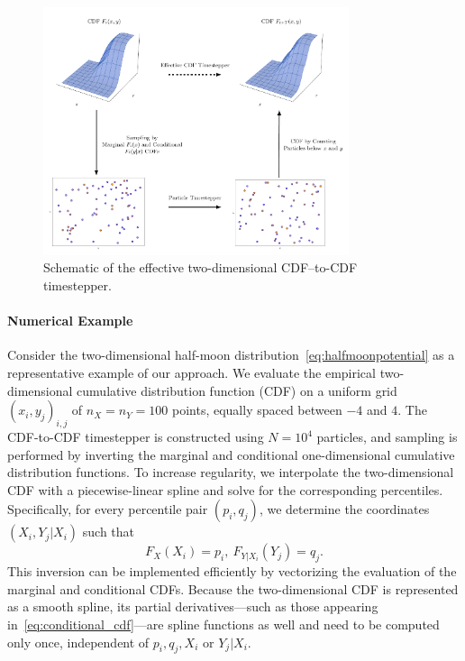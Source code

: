 \documentclass{article}
\begin{document}
\begin{figure}[!ht]
  \centering
  \includegraphics[width=0.8\textwidth]{CDFtoCDF.pdf}
  \caption{Schematic of the effective two-dimensional CDF–to-CDF timestepper.}
  \label{fig:cdftocdf}
\end{figure}

\paragraph{Numerical Example}
Consider the two-dimensional half-moon distribution~\eqref{eq:halfmoonpotential} as a representative example of our approach. We evaluate the empirical two-dimensional cumulative distribution function (CDF) on a uniform grid $(x_i, y_j)_{i,j}$ of $n_X = n_Y = 100$ points, equally spaced between $-4$ and $4$. The CDF-to-CDF timestepper is constructed using $N = 10^4$ particles, and sampling is performed by inverting the marginal and conditional one-dimensional cumulative distribution functions. To increase regularity, we interpolate the two-dimensional CDF with a piecewise-linear spline and solve for the corresponding percentiles. Specifically, for every percentile pair $(p_i, q_j)$, we determine the coordinates $(X_i, Y_j|X_i)$ such that
\begin{equation}
    F_X(X_i) = p_i, \ F_{Y|X_i}(Y_j) = q_j.
\end{equation}
This inversion can be implemented efficiently by vectorizing the evaluation of the marginal and conditional CDFs. Because the two-dimensional CDF is represented as a smooth spline, its partial derivatives—such as those appearing in~\eqref{eq:conditional_cdf}—are spline functions as well and need to be computed only once, independent of $p_i, q_j, X_i$ or $Y_j|X_i$.
\end{document}
